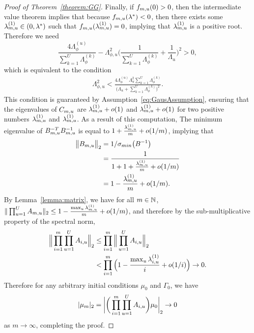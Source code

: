 \begin{proof}[Proof of Theorem~\ref{theorem:GG}]
Finally, if $f_{m, u}(0) > 0$, then the intermediate value theorem implies that because $f_{m, u}(\lambda^*) < 0$, then there exists some $\lambda^{(1)}_{m, u} \in (0, \lambda^{*})$ such that $f_{m, u}(\lambda^{(1)}_{m, u}) = 0$, implying that $\lambda^{(1)}_{m, u}$ is a positive root.
Therefore we need 
$$
\frac{4\Lambda^{(u)}_{\phi}}{\sum_{k = 1}^U\Lambda^{(k)}_{\phi}} - \Lambda_{\phi, u}^2\bigg(\frac{1}{\sum_{k = 1}^U\Lambda^{(k)}_{\phi}} + \frac{1}{\Lambda_u}\bigg)^2 > 0,
$$
which is equivalent to the condition
\begin{align*}
  \Lambda_{\phi, u}^2 < \frac{4\Lambda^{(u)}_\phi\Lambda^2_{u}\sum_{k = 1}^U \Lambda_{\phi}^{(k)}}{\big(\Lambda_u + \sum_{k = 1}^{U}\Lambda^{(k)}_{\phi}\big)^2}.
\end{align*}
This condition is guaranteed by Assumption~\ref{eq:GausAssumption}, ensuring that the eigenvalues of $C_{m, u}$ are $\lambda^{(1)}_{m, u} + o(1)$ and $\lambda^{(1)}_{m, u} + o(1)$ for two positive numbers $\lambda^{(1)}_{m, u}$ and $\lambda^{(1)}_{m, u}$.
As a result of this computation, The minimum eigenvalue of $B^{-T}_{m, u}B^{-1}_{m, u}$ is equal to $1 + \frac{\lambda^{(1)}_{m, u}}{m} + o(1/m)$, implying that 
\begin{align*}
  \big\| B_{m, u}\big\|_2 &= 1 / \sigma_{min}\big(B^{-1} \big) \\
  &= \frac{1}{1 + 1 + \frac{\lambda^{(1)}_{m, u}}{m} + o(1/m)} \\
  &= 1 - \frac{\lambda^{(1)}_{m, u}}{m} + o(1/m). 
\end{align*}
By Lemma~\ref{lemma:matrix}, we have for all $m \in \mathbb{N}$, $\|\prod_{u = 1}^U A_{m, u}\|_2 \leq 1 - \frac{\max_u \lambda^{(1)}_{m, u}}{m} + o(1/m)$, and therefore by the sub-multiplicative property of the spectral norm,
\begin{align*}
  \Big\| \prod_{i = 1}^m \prod_{u = 1}^U A_{i, u}\Big\|_2 & \leq \prod_{i = 1}^m \Big\|\prod_{u = 1}^U A_{i, u}\Big\|_2 \\
  &< \prod_{i = 1}^m \Big(1 - \frac{\max_u \lambda^{(1)}_{i, u}}{i} + o(1/i)\Big) \rightarrow 0.
\end{align*}
Therefore for any arbitrary initial conditions $\mu_0$ and $\Gamma_0$, we have
$$|\mu_m|_2 = \bigg|\bigg(\prod_{i = 1}^m\prod_{u = 1}^U A_{i, u}\bigg)\mu_0\bigg|_2 \rightarrow 0$$
as $m\rightarrow \infty$, completing the proof.
\end{proof}

